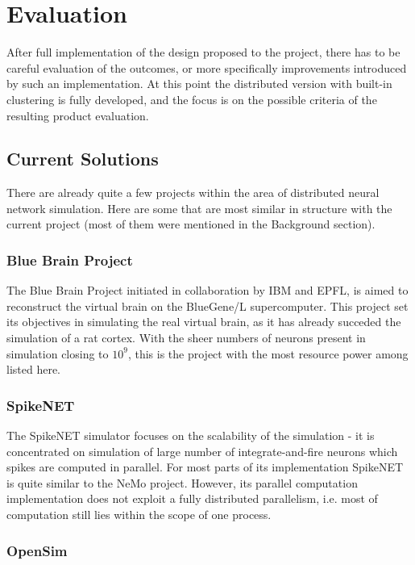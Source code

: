 \chapter{Evaluation}

After full implementation of the design proposed to the project, there has to be careful evaluation of the outcomes, or more specifically improvements introduced by such an implementation. At this point the distributed version with built-in clustering is fully developed, and the focus is on the possible criteria of the resulting product evaluation.

\section{Current Solutions}

There are already quite a few projects within the area of distributed neural network simulation. Here are some that are most similar in structure with the current project (most of them were mentioned in the Background section).

\subsection{Blue Brain Project}

The Blue Brain Project initiated in collaboration by IBM and EPFL, is aimed to reconstruct the virtual brain on the BlueGene/L supercomputer.\cite{BlueBrain} This project set its objectives in simulating the real virtual brain, as it has already succeded the simulation of a rat cortex. With the sheer numbers of neurons present in simulation closing to $10^9$, this is the project with the most resource power among listed here.

\subsection{SpikeNET}

The SpikeNET simulator focuses on the scalability of the simulation - it is concentrated on simulation of large number of integrate-and-fire neurons which spikes are computed in parallel\cite{ArnaudDelorme1999}. For most parts of its implementation SpikeNET is quite similar to the NeMo project. However, its parallel computation implementation does not exploit a fully distributed parallelism, i.e. most of computation still lies within the scope of one process.

\subsection{OpenSim}

